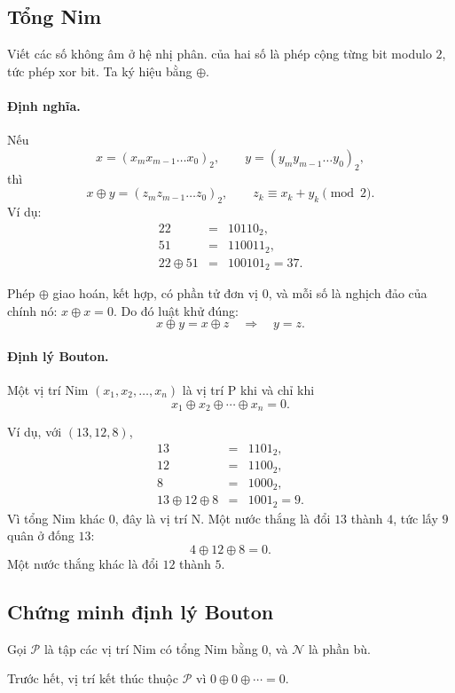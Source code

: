 \documentclass[11pt]{article}
\newcommand{\xor}{\mathbin{\oplus}}
\begin{document}
\subsection{Tổng Nim}

Viết các số không âm ở hệ nhị phân.  của hai số là phép cộng
từng bit modulo \(2\), tức phép xor bit. Ta ký hiệu bằng \(\xor\).

\paragraph{Định nghĩa.}
Nếu
\[
  x=(x_mx_{m-1}\ldots x_0)_2,\qquad
  y=(y_my_{m-1}\ldots y_0)_2,
\]
thì
\[
  x\xor y=(z_mz_{m-1}\ldots z_0)_2,\qquad
  z_k\equiv x_k+y_k\pmod 2.
\]
Ví dụ:
\[
\begin{array}{rcl}
22&=&10110_2,\\
51&=&110011_2,\\ \hline
22\xor 51&=&100101_2=37.
\end{array}
\]

Phép \(\xor\) giao hoán, kết hợp, có phần tử đơn vị \(0\), và mỗi số là nghịch
đảo của chính nó: \(x\xor x=0\). Do đó luật khử đúng:
\[
  x\xor y=x\xor z \quad\Longrightarrow\quad y=z.
\]

\paragraph{Định lý Bouton.}
Một vị trí Nim \((x_1,x_2,\ldots,x_n)\) là vị trí P khi và chỉ khi
\[
  x_1\xor x_2\xor\cdots\xor x_n=0.
\]

Ví dụ, với \((13,12,8)\),
\[
\begin{array}{rcl}
13&=&1101_2,\\
12&=&1100_2,\\
8&=&1000_2,\\ \hline
13\xor12\xor8&=&1001_2=9.
\end{array}
\]
Vì tổng Nim khác \(0\), đây là vị trí N. Một nước thắng là đổi \(13\) thành
\(4\), tức lấy \(9\) quân ở đống \(13\):
\[
  4\xor12\xor8=0.
\]
Một nước thắng khác là đổi \(12\) thành \(5\).

\subsection{Chứng minh định lý Bouton}

Gọi \(\mathcal P\) là tập các vị trí Nim có tổng Nim bằng \(0\), và
\(\mathcal N\) là phần bù.

Trước hết, vị trí kết thúc thuộc \(\mathcal P\) vì \(0\xor0\xor\cdots=0\).
\end{document}
